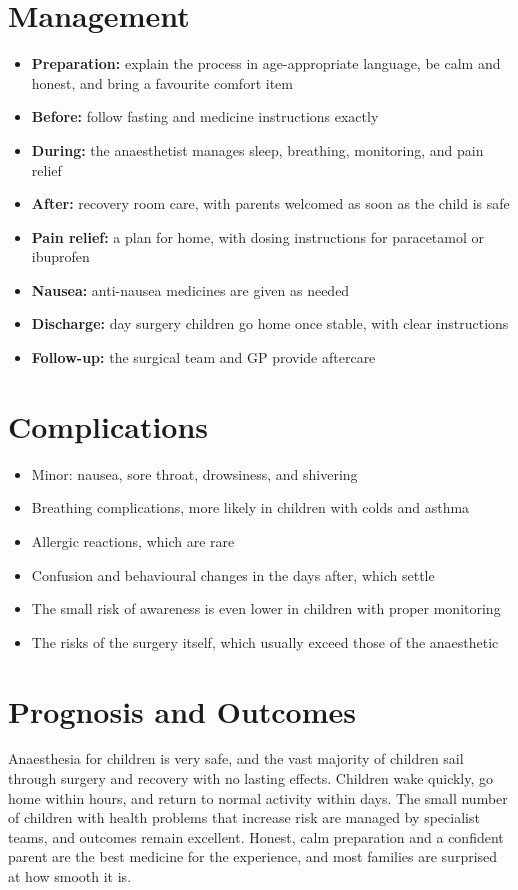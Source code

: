 \section*{Management}
\begin{itemize}
    \item \textbf{Preparation:} explain the process in age-appropriate language, be calm and honest, and bring a favourite comfort item
    \item \textbf{Before:} follow fasting and medicine instructions exactly
    \item \textbf{During:} the anaesthetist manages sleep, breathing, monitoring, and pain relief
    \item \textbf{After:} recovery room care, with parents welcomed as soon as the child is safe
    \item \textbf{Pain relief:} a plan for home, with dosing instructions for paracetamol or ibuprofen
    \item \textbf{Nausea:} anti-nausea medicines are given as needed
    \item \textbf{Discharge:} day surgery children go home once stable, with clear instructions
    \item \textbf{Follow-up:} the surgical team and GP provide aftercare
\end{itemize}

\section*{Complications}
\begin{itemize}
    \item Minor: nausea, sore throat, drowsiness, and shivering
    \item Breathing complications, more likely in children with colds and asthma
    \item Allergic reactions, which are rare
    \item Confusion and behavioural changes in the days after, which settle
    \item The small risk of awareness is even lower in children with proper monitoring
    \item The risks of the surgery itself, which usually exceed those of the anaesthetic
\end{itemize}

\section*{Prognosis and Outcomes}
Anaesthesia for children is very safe, and the vast majority of children sail through surgery and recovery with no lasting effects. Children wake quickly, go home within hours, and return to normal activity within days. The small number of children with health problems that increase risk are managed by specialist teams, and outcomes remain excellent. Honest, calm preparation and a confident parent are the best medicine for the experience, and most families are surprised at how smooth it is.

